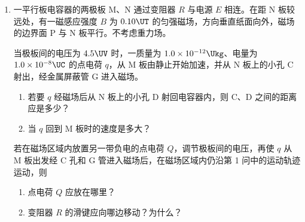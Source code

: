 \documentclass[\gkver]{gaokaozhenti}
\begin{document}
\begin{enumerate}


\item
一平行板电容器的两极板 M、N 通过变阻器 $R$ 与电源 $E$ 相连。在距 N 板较远处，有一磁感应强度 $B$ 为 $0.10\UT$ 的匀强磁场，方向垂直纸面向外，磁场的边界面 P 与 N 板平行。不考虑重力场。

当极板间的电压为 $4.5\UV$ 时，一质量为 $1.0\times10^{-12}\Ukg$、电量为 $1.0\times10^{-8}\UC$ 的点电荷 $q$，从 M 板由静止开始加速，并从 N 板上的小孔 C 射出，经金属屏蔽管 G 进入磁场。
\begin{enumerate}
	\item
	若要 $q$ 经磁场后从 N 板上的小孔 D 射回电容器内，则 C、D 之间的距离应是多少？

	\item
	当 $q$ 回到 M 板时的速度是多大？
\end{enumerate}

若在磁场区域内放置另一带负电的点电荷 $Q$，调节极板间的电压，再使 $q$ 从 M 板出发经 C 孔和 G 管进入磁场后，在磁场区域内仍沿第 1 问中的运动轨迹运动，则
\begin{enumerate}
	\item
	点电荷 $Q$ 应放在哪里？

	\item
	变阻器 $R$ 的滑键应向哪边移动？为什么？
\end{enumerate}
\onepicture[align=right, w=6cm]{}

\end{enumerate}
\end{document}
